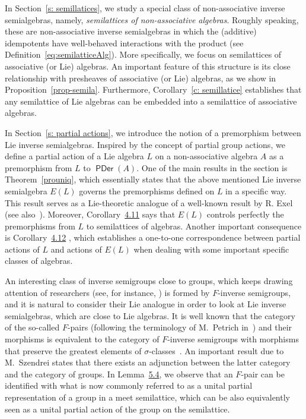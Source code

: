 \documentclass[10pt,a4paper]{amsart}
\theoremstyle{definition}
\theoremstyle{remark}
\numberwithin{equation}{section}
\newtheorem*{Theorem A}{\textbf{Theorem A}}
\newtheorem*{Corollary E}{\textbf{Corollary E}}
\newtheorem*{Corollary F}{\textbf{Corollary F}}
\newtheorem*{Theorem B}{\textbf{Theorem B}}
\newtheorem*{Theorem C}{\textbf{Theorem C}}
\newtheorem*{Theorem D}{\textbf{Theorem B}}
\newtheorem*{p a}{\textbf{Proof of  Theorem A}}
\newtheorem*{p b}{\textbf{Proof of Theorem B}}
\newtheorem*{p c}{\textbf{Proof of  Theorem C}}
\newtheorem*{p d}{\textbf{Proof of  Theorem D}}
\newcommand{\0}{{\vartheta}}
\DeclareMathOperator{\pde}{\textsf{PDer}}
\begin{document}
In Section~\ref{s: semillatices}, we study a special class of non-associative inverse semialgebras, namely, {\em semilattices of non-associative algebras}. Roughly speaking, these are non-associative inverse semialgebras in which the (additive) idempotents have well-behaved interactions with the product (see Definition~\ref{eq:semilatticeAlg}). More specifically, we focus on semilattices of  associative (or Lie) algebras. An important feature of this structure is its close relationship with presheaves of   associative (or Lie)  algebras, as  we  show in Proposition~\ref{prop-semila}. Furthermore, Corollary~\ref{c: semillatice} establishes that any semilattice of Lie algebras can be embedded into a semilattice of associative algebras.

In Section~\ref{s: partial actions}, we introduce the notion of a premorphism between Lie inverse semialgebras. Inspired by the concept of partial group actions, we define a partial action of a Lie algebra $L$ on a non-associative algebra $A$ as a premorphism from $L$ to $\pde(A)$. One of the main results in  the section is Theorem~\ref{prouniq}, which essentially states that the  above mentioned Lie inverse semialgebra $E(L)$ governs the premorphisms defined on $L$ in a specific way. This result serves as a Lie-theoretic analogue of a well-known result by R. Exel~\cite[Proposition 2.2]{Exel1998} (see also~\cite[Theorem 2.4]{KL}).  Moreover,  Corollary~\href{https://arxiv.org/abs/2505.03081v2}{4.11} says that  $E(L)$ controls perfectly the premorphisms from $L$ to  semilattices of algebras.   Another important consequence is  Corollary~\href{https://arxiv.org/abs/2505.03081v2}{4.12} , which  establishes a one-to-one correspondence between  partial actions of $L$ and actions of $E(L)$ when dealing with some important specific classes of algebras.


 An interesting class of inverse semigroups close to groups, which keeps drawing attention  of researchers (see, for instance, \cite{KudFur}) is formed by  $F$-inverse semigroups, and it is natural to consider their Lie  analogue in order to look at Lie inverse   semialgebras, which are close to Lie algebras. It is well known that the category of the so-called $F$-pairs (following the terminology of M.~Petrich in~\cite{Petrich1984}) and their morphisms is equivalent to the category of $F$-inverse semigroups with morphisms that preserve the greatest elements of $\sigma$-classes~\cite[VII.6]{Petrich1984}. An important result due to  M.~Szendrei \cite{Szendrei}  states that there exists an adjunction between  the latter category and the category of groups. In Lemma~\href{https://arxiv.org/abs/2505.03081v2}{5.4}, we observe that an $F$-pair can be identified with what is now commonly referred to as a unital partial representation of a group in a meet semilattice,  which can  be also equivalently seen as a unital partial action of the group on the semilattice. 
\end{document}
